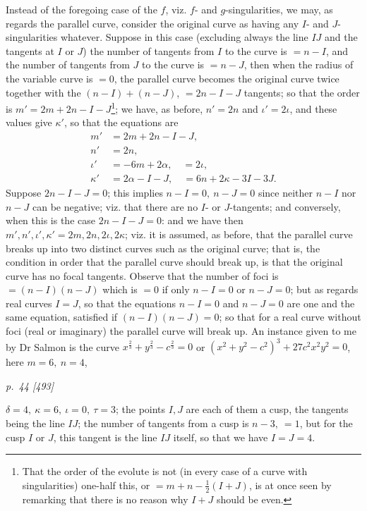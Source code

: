 ﻿\documentclass[11pt,a4paper]{article}
\theoremstyle{plain}
\theoremstyle{definition}
\begin{document}
Instead of the foregoing case of the \(f\), viz. \(f\)- and
\(g\)-singularities, we may, as regards the parallel curve, consider the
original curve as having any \(I\)- and \(J\)-singularities whatever.
Suppose in this case (excluding always the line \(IJ\) and the tangents at
\(I\) or \(J\)) the number of tangents from \(I\) to the curve is \(=n-I\),
and the number of tangents from \(J\) to the curve is \(=n-J\), then when
the radius of the variable curve is \(=0\), the parallel curve becomes the
original curve twice together with the \((n-I)+(n-J)\), \(=2n-I-J\)
tangents; so that the order is
\(m'=2m+2n-I-J\)\footnote{That the order of the evolute is not (in every
case of a curve with singularities) one-half this, or
\(=m+n-\frac12(I+J)\), is at once seen by remarking that there is no reason
why \(I+J\) should be even.}; we have, as before, \(n'=2n\) and
\(\iota'=2\iota\), and these values give \(\kappa'\), so that the
equations are
\[
\begin{aligned}
m'&=2m+2n-I-J,\\
n'&=2n,\\
\iota'&=-6m+2\alpha,\quad =2\iota,\\
\kappa'&=2\alpha-I-J,\quad =6n+2\kappa-3I-3J.
\end{aligned}
\]
Suppose \(2n-I-J=0\); this implies \(n-I=0,\ n-J=0\) since neither
\(n-I\) nor \(n-J\) can be negative; viz. that there are no \(I\)- or
\(J\)-tangents; and conversely, when this is the case \(2n-I-J=0\): and we
have then \(m',n',\iota',\kappa'=2m,2n,2\iota,2\kappa\); viz. it is
assumed, as before, that the parallel curve breaks up into two distinct
curves such as the original curve; that is, the condition in order that the
parallel curve should break up, is that the original curve has no focal
tangents. Observe that the number of foci is \(=(n-I)(n-J)\) which is
\(=0\) if only \(n-I=0\) or \(n-J=0\); but as regards real curves \(I=J\),
so that the equations \(n-I=0\) and \(n-J=0\) are one and the same
equation, satisfied if \((n-I)(n-J)=0\); so that for a real curve without
foci (real or imaginary) the parallel curve will break up. An instance
given to me by Dr Salmon is the curve
\(x^{\frac23}+y^{\frac23}-c^{\frac23}=0\) or
\((x^2+y^2-c^2)^3+27c^2x^2y^2=0\), here \(m=6,\ n=4\),

\clearpage
\textit{p.~44 [493]}

\(\delta=4,\ \kappa=6,\ \iota=0,\ \tau=3\); the points \(I,J\) are each of
them a cusp, the tangents being the line \(IJ\); the number of tangents
from a cusp is \(n-3,\ =1\), but for the cusp \(I\) or \(J\), this tangent
is the line \(IJ\) itself, so that we have \(I=J=4\).
\end{document}
